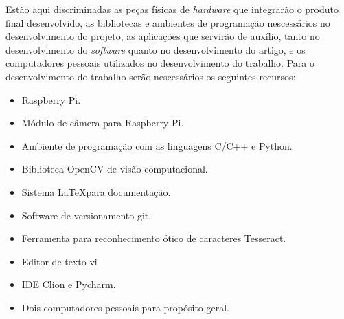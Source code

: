 Estão aqui discriminadas as peças físicas de \emph{hardware} que integrarão o
produto final desenvolvido, as bibliotecas e ambientes de programação
nescessários no desenvolvimento do projeto, as aplicações que servirão de
auxílio, tanto no desenvolvimento do \emph{software} quanto no desenvolvimento
do artigo, e os computadores pessoais utilizados no desenvolvimento do trabalho.
Para o desenvolvimento do trabalho serão nescessários os seguintes recursos:

\begin{itemize}
	\item Raspberry Pi.
	\item Módulo de câmera para Raspberry Pi.
	\item Ambiente de programação com as linguagens C/C++ e Python.
	\item Biblioteca OpenCV de visão computacional.
	\item Sistema \LaTeX para documentação.
	\item Software de versionamento git.
	\item Ferramenta para reconhecimento ótico de caracteres Tesseract.
	\item Editor de texto vi
	\item IDE Clion e Pycharm.
	\item Dois computadores pessoais para propósito geral.
\end{itemize}
